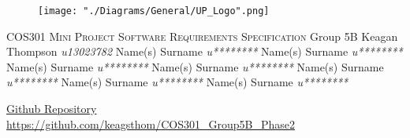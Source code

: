 \begin{titlepage}
\begin{center}
\begin{figure}[t]
\centering
\texttt{[image: "./Diagrams/General/UP\_Logo".png]}
\end{figure}
\begin{flushright}
\textsc{\LARGE COS301 Mini Project \newline\newline Software Requirements \newline   Specification}
\newline\newline \Large Group 5B \newline\newline
\large
Keagan Thompson    \emph{u13023782} \newline
Name(s) Surname    \emph{u********} \newline
Name(s) Surname    \emph{u********} \newline
Name(s) Surname    \emph{u********} \newline
Name(s) Surname    \emph{u********} \newline
Name(s) Surname    \emph{u********} \newline
Name(s) Surname    \emph{u********} \newline
Name(s) Surname    \emph{u********} \newline
\end{flushright}
\vfill
\href{https://github.com/keagsthom/COS301_Group5B_Phase2}{Github Repository}\\
\url{https://github.com/keagsthom/COS301_Group5B_Phase2}
\end{center}
\end{titlepage}